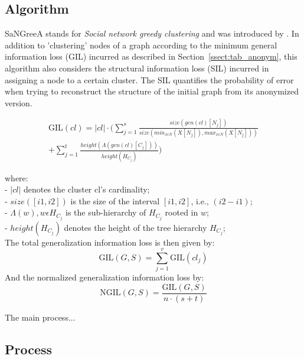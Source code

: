 \documentclass{llncs}
\providecommand{\abs}[1]{\lvert#1\rvert}
\begin{document}
\subsection{Algorithm}
\label{ssect:algorithm}

SaNGreeA stands for \textit{Social network greedy clustering} and was introduced by \cite{campan2009data}. In addition to 'clustering' nodes of a graph according to the minimum general information loss (GIL) incurred as described in Section~\ref{ssect:tab_anonym}, this algorithm also considers the structural information loss (SIL) incurred in assigning a node to a certain cluster. The SIL quantifies the probability of error when trying to reconstruct the structure of the initial graph from its anonymized version.

\begin{equation*}
\begin{split}
\text{GIL}(cl) = \abs{cl} \cdot (\sum_{j=1}^{s} \frac{size(gen(cl)[N_j])}{size(min_{x \epsilon N} (X[N_j]), max_{x \epsilon N} (X[N_j]))} \\
+ \sum_{j=1}^{t} \frac{height(\Lambda(gen(cl)[C_j]))}{height(H_{C_j})})
\end{split}
\end{equation*}


where:\\
- $\abs{cl}$ denotes the cluster cl's cardinality; \\
- $size([i1,i2])$ is the size of the interval $[i1,i2]$, i.e., $(i2-i1)$; \\
- $\Lambda(w), w \epsilon H_{C_j}$ is the sub-hierarchy of $H_{C_j}$ rooted in $w$; \\
- $height(H_{C_j})$ denotes the height of the tree hierarchy $H_{C_j}$; \\


The total generalization information loss is then given by:
\begin{equation*}
\text{GIL}(G,S) = \sum_{j=1}^{v} \text{GIL}(cl_j)
\end{equation*}
And the normalized generalization information loss by:
\begin{equation*}
\text{NGIL}(G,S) = \frac{\text{GIL}(G,S)}{n \cdot (s+t)}
\end{equation*}

The main process...


\subsection{Process}
\label{ssect:process}
\end{document}
